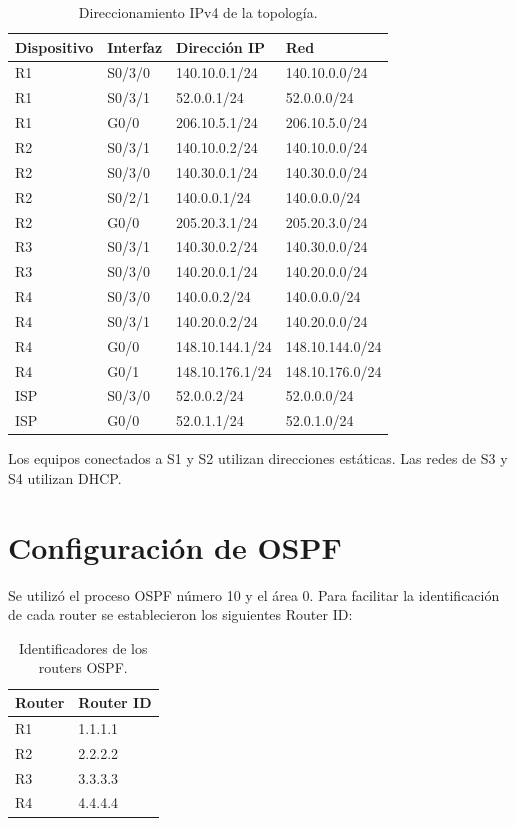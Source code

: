 \documentclass[12pt,a4paper]{article}
\begin{document}
\begin{table}[H]
\centering
\caption{Direccionamiento IPv4 de la topología.}
\label{tab:direccionamiento}
\small

\begin{tabular}{llll}
\toprule
Dispositivo & Interfaz & Dirección IP & Red \\
\midrule
R1 & S0/3/0 & 140.10.0.1/24 & 140.10.0.0/24 \\
R1 & S0/3/1 & 52.0.0.1/24 & 52.0.0.0/24 \\
R1 & G0/0 & 206.10.5.1/24 & 206.10.5.0/24 \\
\midrule
R2 & S0/3/1 & 140.10.0.2/24 & 140.10.0.0/24 \\
R2 & S0/3/0 & 140.30.0.1/24 & 140.30.0.0/24 \\
R2 & S0/2/1 & 140.0.0.1/24 & 140.0.0.0/24 \\
R2 & G0/0 & 205.20.3.1/24 & 205.20.3.0/24 \\
\midrule
R3 & S0/3/1 & 140.30.0.2/24 & 140.30.0.0/24 \\
R3 & S0/3/0 & 140.20.0.1/24 & 140.20.0.0/24 \\
\midrule
R4 & S0/3/0 & 140.0.0.2/24 & 140.0.0.0/24 \\
R4 & S0/3/1 & 140.20.0.2/24 & 140.20.0.0/24 \\
R4 & G0/0 & 148.10.144.1/24 & 148.10.144.0/24 \\
R4 & G0/1 & 148.10.176.1/24 & 148.10.176.0/24 \\
\midrule
ISP & S0/3/0 & 52.0.0.2/24 & 52.0.0.0/24 \\
ISP & G0/0 & 52.0.1.1/24 & 52.0.1.0/24 \\
\bottomrule
\end{tabular}
\end{table}

Los equipos conectados a S1 y S2 utilizan direcciones estáticas. Las redes de S3 y S4 utilizan DHCP.

\section{Configuración de OSPF}

Se utilizó el proceso OSPF número 10 y el área 0. Para facilitar la identificación de cada router se establecieron los siguientes Router ID:

\begin{table}[H]
\centering
\caption{Identificadores de los routers OSPF.}
\begin{tabular}{ll}
\toprule
Router & Router ID \\
\midrule
R1 & 1.1.1.1 \\
R2 & 2.2.2.2 \\
R3 & 3.3.3.3 \\
R4 & 4.4.4.4 \\
\bottomrule
\end{tabular}
\end{table}
\end{document}
